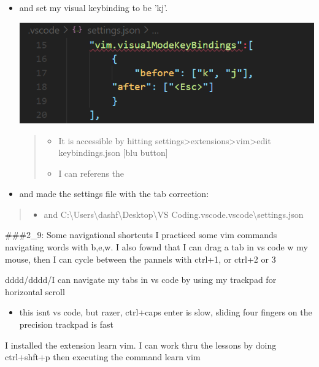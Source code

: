 \begin{itemize}
\item
  and set my visual keybinding to be 'kj'.

\includegraphics{kj-key.png}

  \begin{quote}
  \begin{itemize}
  \tightlist
  \item
    It is accessible by hitting
    settings\textgreater extensions\textgreater vim\textgreater edit
    keybindings.json {[}blu button{]}
  \item
    I can referens the
  \end{itemize}
  \end{quote}
\item
  and made the settings file with the tab correction:
\end{itemize}
\begin{quote}
\begin{itemize}
\tightlist
\item
  and
  C:\textbackslash Users\textbackslash dashf\textbackslash Desktop\textbackslash VS
  Coding.vscode.vscode\textbackslash settings.json
\end{itemize}
\end{quote}

\#\#\#2\_9: Some navigational shortcuts I practiced some vim commands
navigating words with b,e,w. I also fownd that I can drag a tab in vs
code w my mouse, then I can cycle between the pannels with ctrl+1, or
ctrl+2 or 3

dddd/dddd/I can navigate my tabs in vs code by using my trackpad for
horizontal scroll

\begin{itemize}
\tightlist
\item
  this isnt vs code, but razer, ctrl+caps enter is slow, sliding four
  fingers on the precision trackpad is fast
\end{itemize}

I installed the extension learn vim. I can work thru the lessons by
doing ctrl+shft+p then executing the command learn vim

